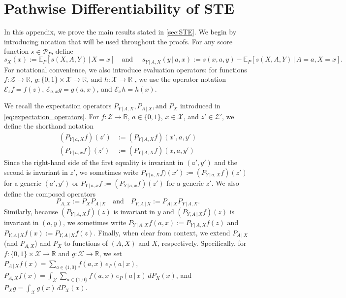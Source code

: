 \documentclass{article}
\theoremstyle{plain}
\theoremstyle{definition}
\theoremstyle{remark}
\newcommand{\R}{\mathbb{R}}
\newcommand{\E}{\mathbb{E}}
\newcommand{\off}[1]{\left[#1\right]}
\newcommand{\cZ}{\mathcal{Z}}
\newcommand{\cP}{\mathcal{P}}
\newcommand{\cX}{\mathcal{X}}
\newcommand{\ucE}{\mathscr{E}}
\newcommand{\1}{\mathbbm{1}}
\theoremstyle{plain}
\theoremstyle{definition}
\newcommand{\mymid}{\,|\,}
\newcommand{\tand}{\textrm{and }}
\begin{document}
\section{Pathwise Differentiability of STE}

In this appendix, we prove the main results stated in \cref{sec:STE}. We begin by introducing notation that will be used throughout the proofs. For any score function $s \in \dot{\cP}_P$, define 
\begin{equation}\label{eq:score_conditionals}
    s_X(x) := \E_P\off{s(X, A, Y) \mymid X=x} \quad \tand \quad s_{Y \mymid A, X}(y \mymid a,x) := s(x,a,y) - \E_P\off{s(X, A, Y) \mymid A=a, X=x}.
\end{equation}
For notational convenience, we also introduce evaluation operators: for functions $f: \cZ \to \R$, $g: \{0,1\} \times \cX \to \R,
\, \tand h: \cX \to \R$ , we use the operator notation $\ucE_z f = f(z)$, $\ucE_{a,x} g = g(a,x)$, and $\ucE_x h = h(x)$. 

We recall the expectation operators $P_{Y \mymid A, X}, P_{A \mymid X}, \tand P_X$ introduced in \eqref{eq:expectation_operators}.
For $f:\mathcal{Z}\to\mathbb{R}$, $a\in\{0,1\}$, $x\in\mathcal{X}$, and $z'\in\mathcal{Z}'$, we define the shorthand notation
\begin{align}\label{eq:expectation_operators_shorthand}
    (P_{Y \mymid a, X}f)(z')&:= (P_{Y \mymid A, X}f)(x',a,y') \nonumber\\
    (P_{Y \mymid a, x}f)(z')&:= (P_{Y \mymid A, X}f)(x,a,y')
\end{align}
Since the right-hand side of the first equality is invariant in $(a',y')$ and the second is invariant in $z'$, we sometimes write $P_{Y \mymid a, X}f)(x'):= (P_{Y \mymid a, X}f)(z')$ for a generic $(a',y')$ or $P_{Y \mymid a, x}f:=(P_{Y \mymid a, x}f)(z')$ for a generic $z'$. We also define the composed operators
\begin{equation}\label{eq:composed_expectation_operators}
    P_{A, X} := P_X P_{A \mymid X} \quad \text{and} \quad P_{Y,A \mymid X} := P_{A \mymid X} P_{Y \mymid A,X}.
\end{equation}
Similarly, because $(P_{Y \mymid A,X}f)(z)$ is invariant in $y$ and
$(P_{Y,A \mymid X}f)(z)$ is invariant in $(a,y)$, we sometimes write $P_{Y \mymid A, X} f(a,x) := P_{Y \mymid A, X} f(z)$ and $P_{Y, A \mymid X} f(x) := P_{Y, A \mymid X} f(z)$. Finally, when clear from context, we extend $P_{A \mymid X}$ (and $P_{A, X}$) and $P_X$ to functions
of $(A,X)$ and $X$, respectively. Specifically, for
$f:\{0,1\}\times\mathcal{X}\to\mathbb{R}$ and
$g:\mathcal{X}\to\mathbb{R}$, we set $P_{A \mymid X} f(x) = \sum_{a \in \{1,0\}} f(a, x) \,e_P(a \mymid x)$, $P_{A, X} f(x) = \int_{\cX} \sum_{a \in \{1,0\}} f(a, x) \,e_P(a \mymid x) \,dP_X(x)$, and $P_X g = \int_\cX g(x) \, dP_X(x)$. 
\end{document}
